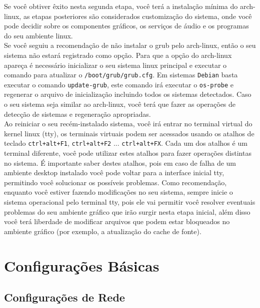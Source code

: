 \documentclass[12pt,a4paper]{article}
\begin{document}
Se você obtiver êxito nesta segunda etapa, você terá a instalação mínima do arch-linux, as etapas posteriores são considerados customização do sistema, onde você pode decidir sobre os componentes gráficos, os serviços de áudio e os programas do seu ambiente linux.\\

Se você seguiu a recomendação de não instalar o grub pelo arch-linux, então o seu sistema não estará registrado como opção. Para que a opção do arch-linux apareça é necessário inicializar o seu sistema linux principal e executar o comando para atualizar o \texttt{/boot/grub/grub.cfg}. Em sistemas \texttt{Debian} basta executar o comando \texttt{update-grub}, este comando irá executar o \texttt{os-probe} e regenerar o arquivo de inicialização incluindo todos os sistemas detectados. Caso o seu sistema seja similar ao arch-linux, você terá que fazer as operações de detecção de sistemas e regeneração apropriadas.\\

Ao reiniciar o seu recém-instalado sistema, você irá entrar no terminal virtual do kernel linux (tty), os terminais virtuais podem ser acessados usando os atalhos de teclado \texttt{ctrl+alt+F1}, \texttt{ctrl+alt+F2} ... \texttt{ctrl+alt+FX}. Cada um dos atalhos é um terminal diferente, você pode utilizar estes atalhos para fazer operações distintas no sistema. É importante saber destes atalhos, pois em caso de falha de um ambiente desktop instalado você pode voltar para a interface inicial tty, permitindo você solucionar os possíveis problemas. Como recomendação, enquanto você estiver fazendo modificações no seu sistema, sempre inicie o sistema operacional pelo terminal tty, pois ele vai permitir você resolver eventuais problemas do seu ambiente gráfico que irão surgir nesta etapa inicial, além disso você terá liberdade de modificar arquivos que podem estar bloqueados no ambiente gráfico (por exemplo, a atualização do cache de fonte). \\


\section{Configurações Básicas}

\subsection{Configurações de Rede}
\end{document}
